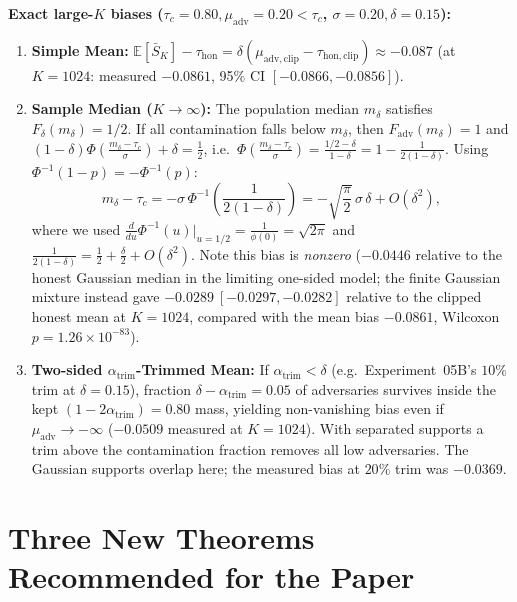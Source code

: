 \documentclass[11pt]{article}
\newcommand{\E}{\mathbb{E}}
\begin{document}
\textbf{Exact large-$K$ biases ($\tau_c = 0.80, \mu_{\mathrm{adv}} = 0.20 < \tau_c$, $\sigma = 0.20, \delta = 0.15$):}
\begin{enumerate}[leftmargin=*,itemsep=2pt]
\item \textbf{Simple Mean:} $\E[\bar{S}_K] - \tau_{\mathrm{hon}} = \delta(\mu_{\mathrm{adv,clip}} - \tau_{\mathrm{hon,clip}}) \approx -0.087$ (at $K=1024$: measured $-0.0861$, 95\% CI $[-0.0866, -0.0856]$).
\item \textbf{Sample Median ($K \to \infty$):} The population median $m_\delta$ satisfies $F_\delta(m_\delta) = 1/2$. If all contamination falls below $m_\delta$, then $F_{\mathrm{adv}}(m_\delta)=1$ and $(1 - \delta)\Phi\!\left(\frac{m_\delta - \tau_c}{\sigma}\right) + \delta = \frac{1}{2}$, i.e.\ $\Phi\!\left(\frac{m_\delta - \tau_c}{\sigma}\right) = \frac{1/2 - \delta}{1 - \delta} = 1 - \frac{1}{2(1-\delta)}$. Using $\Phi^{-1}(1 - p) = -\Phi^{-1}(p)$:
\begin{equation}
\boxed{m_\delta - \tau_c = -\sigma\,\Phi^{-1}\!\left(\frac{1}{2(1-\delta)}\right)
= -\sqrt{\frac{\pi}{2}}\,\sigma\,\delta + O(\delta^2),}
\end{equation}
where we used $\frac{d}{du}\Phi^{-1}(u)\big|_{u=1/2} = \frac{1}{\phi(0)} = \sqrt{2\pi}$ and $\frac{1}{2(1-\delta)} = \frac{1}{2} + \frac{\delta}{2} + O(\delta^2)$. Note this bias is \emph{nonzero} ($-0.0446$ relative to the honest Gaussian median in the limiting one-sided model; the finite Gaussian mixture instead gave $-0.0289~[-0.0297, -0.0282]$ relative to the clipped honest mean at $K=1024$, compared with the mean bias $-0.0861$, Wilcoxon $p = 1.26 \times 10^{-83}$).
\item \textbf{Two-sided $\alpha_{\mathrm{trim}}$-Trimmed Mean:} If $\alpha_{\mathrm{trim}} < \delta$ (e.g.\ Experiment~05B's $10\%$ trim at $\delta = 0.15$), fraction $\delta - \alpha_{\mathrm{trim}} = 0.05$ of adversaries survives inside the kept $(1 - 2\alpha_{\mathrm{trim}}) = 0.80$ mass, yielding non-vanishing bias even if $\mu_{\mathrm{adv}} \to -\infty$ ($-0.0509$ measured at $K=1024$). With separated supports a trim above the contamination fraction removes all low adversaries. The Gaussian supports overlap here; the measured bias at $20\%$ trim was $-0.0369$.
\end{enumerate}

\section{Three New Theorems Recommended for the Paper}
\label{sec:new_theorems}
\end{document}
